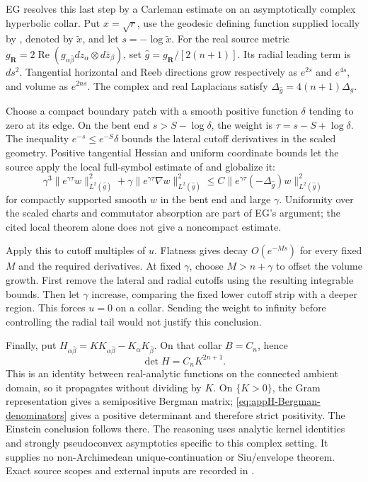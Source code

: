 EG resolves this last step by a Carleman estimate on an
asymptotically complex hyperbolic collar. Put $x=\sqrt r$,
use the geodesic defining function supplied locally by
\cite[Lemma~3.1, author copy]{GuillarmouSaBarretoACHAuthorCopy},
denoted by $\widetilde x$, and let $s=-\log\widetilde x$.
For the real source metric
$g_{\mathbf R}=2\operatorname{Re}(g_{\alpha\bar\beta}
 dz_\alpha\otimes d\bar z_\beta)$, set
$\widehat g=g_{\mathbf R}/[2(n+1)]$.
Its radial leading term is $ds^2$. Tangential horizontal and
Reeb directions grow respectively as $e^{2s}$ and $e^{4s}$,
and volume as $e^{2ns}$. The complex and real Laplacians satisfy
$\Delta_{\widehat g}=4(n+1)\Delta_g$.

Choose a compact boundary patch with a smooth positive function
$\delta$ tending to zero at its edge. On the bent end
$s>S-\log\delta$, the weight is $\tau=s-S+\log\delta$.
The inequality $e^{-s}\leq e^{-S}\delta$ bounds the lateral cutoff
derivatives in the scaled geometry. Positive tangential Hessian
and uniform coordinate bounds let the source apply the local
full-symbol estimate of
\cite[Theorem~28.2.3]{HormanderIV09Reprint} and globalize it:
\begin{equation*}
 \gamma^3\|e^{\gamma\tau}w\|_{L^2(\widehat g)}^2
 +\gamma\|e^{\gamma\tau}\nabla w\|_{L^2(\widehat g)}^2
 \leq C\|e^{\gamma\tau}(-\Delta_{\widehat g})w\|_{L^2(\widehat g)}^2
 \tag{H.39}\label{eq:appH-Bergman-Carleman}
\end{equation*}
for compactly supported smooth $w$ in the bent end and large
$\gamma$. Uniformity over the scaled charts and commutator
absorption are part of EG's argument; the cited local theorem
alone does not give a noncompact estimate.

Apply this to cutoff multiples of $u$. Flatness gives decay
$O(e^{-Ms})$ for every fixed $M$ and the required derivatives.
At fixed $\gamma$, choose $M>n+\gamma$ to offset the volume growth.
First remove the lateral and radial cutoffs using the resulting
integrable bounds. Then let $\gamma$ increase, comparing the fixed
lower cutoff strip with a deeper region. This forces $u=0$
on a collar. Sending the weight to infinity before controlling
the radial tail would not justify this conclusion.

Finally, put
$H_{\alpha\bar\beta}=K K_{\alpha\bar\beta}-K_\alpha K_{\bar\beta}$.
On that collar $B=C_n$, hence
\begin{equation*}
 \det H=C_n K^{2n+1}.
 \tag{H.40}\label{eq:appH-Bergman-denominators}
\end{equation*}
This is an identity between real-analytic functions on the
connected ambient domain, so it propagates without dividing by
$K$. On $\{K>0\}$, the Gram representation gives a semipositive
Bergman matrix; \eqref{eq:appH-Bergman-denominators} gives a
positive determinant and therefore strict positivity. The
Einstein conclusion follows there. The reasoning uses analytic
kernel identities and strongly pseudoconvex asymptotics specific
to this complex setting. It supplies no non-Archimedean
unique-continuation or Siu/envelope theorem. Exact source scopes
and external inputs are recorded in
.

